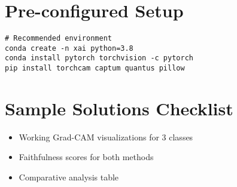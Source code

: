 \section*{Pre-configured Setup}
\begin{verbatim}
# Recommended environment
conda create -n xai python=3.8
conda install pytorch torchvision -c pytorch
pip install torchcam captum quantus pillow
\end{verbatim}

\section*{Sample Solutions Checklist}
\begin{itemize}
\item [ ] Working Grad-CAM visualizations for 3 classes
\item [ ] Faithfulness scores for both methods
\item [ ] Comparative analysis table
\end{itemize}
